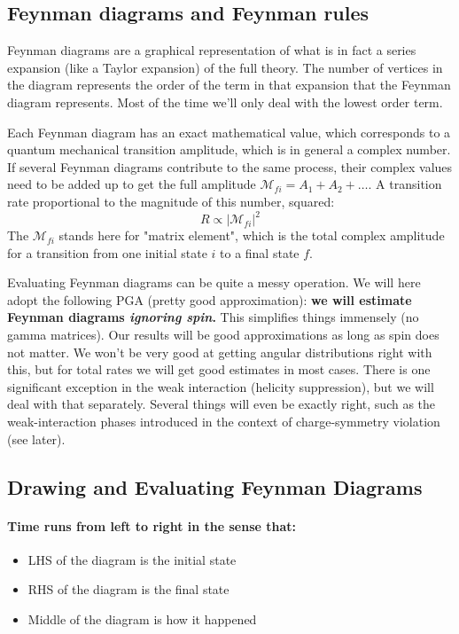\subsection{Feynman diagrams and Feynman rules}

Feynman diagrams are a graphical representation of what is in fact a series expansion (like a Taylor expansion) of the full theory. The number of vertices in the diagram represents the order of the term in that expansion that the Feynman diagram represents. Most of the time we'll only deal with the lowest order term.

Each Feynman diagram has an exact mathematical value, which corresponds to a quantum mechanical transition amplitude, which is in general a complex number. If several Feynman diagrams contribute to the same process, their complex values need to be added up to get the full amplitude $\mathcal{M}_{fi} = A_1 + A_2 + \ldots$. A transition rate proportional to the magnitude of this number, squared:
\begin{equation}
    R \propto \left| \mathcal{M}_{fi} \right|^2
\end{equation}
The $\mathcal{M}_{fi}$ stands here for "matrix element", which is the total complex amplitude for a transition from one initial state $i$ to a final state $f$.

Evaluating Feynman diagrams can be quite a messy operation. We will here adopt the following PGA (pretty good approximation): \textbf{we will estimate Feynman diagrams \emph{ignoring spin}.} This simplifies things immensely (no gamma matrices). Our results will be good approximations as long as spin does not matter. We won't be very good at getting angular distributions right with this, but for total rates we will get good estimates in most cases. There is one significant exception in the weak interaction (helicity suppression), but we will deal with that separately. Several things will even be exactly right, such as the weak-interaction phases introduced in the context of charge-symmetry violation (see later).

\subsection{Drawing and Evaluating Feynman Diagrams}

\paragraph{Time runs from left to right in the sense that:}
\begin{itemize}
\item LHS of the diagram is the initial state
\item RHS of the diagram is the final state
\item Middle of the diagram is how it happened
\end{itemize}

